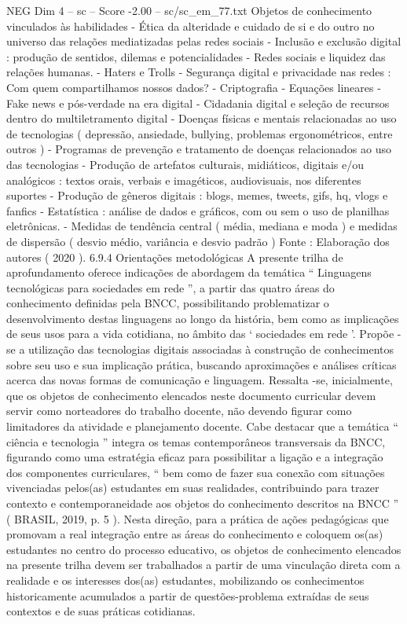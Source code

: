\begin{textsample}{NEG Dim 4 – sc – Score -2.00 – sc/sc\_em\_77.txt}
Objetos de conhecimento vinculados às habilidades - Ética da alteridade e cuidado de si e do outro no universo das relações mediatizadas pelas redes sociais - Inclusão e exclusão digital : produção de sentidos, dilemas e potencialidades - Redes sociais e liquidez das relações humanas. - Haters e Trolls - Segurança digital e privacidade nas redes : Com quem compartilhamos nossos dados? - Criptografia - Equações lineares - Fake news e pós-verdade na era digital - Cidadania digital e seleção de recursos dentro do multiletramento digital - Doenças físicas e mentais relacionadas ao uso de tecnologias ( depressão, ansiedade, bullying, problemas ergonométricos, entre outros ) - Programas de prevenção e tratamento de doenças relacionados ao uso das tecnologias - Produção de artefatos culturais, midiáticos, digitais e/ou analógicos : textos orais, verbais e imagéticos, audiovisuais, nos diferentes suportes - Produção de gêneros digitais : blogs, memes, tweets, gifs, hq, vlogs e fanfics - Estatística : análise de dados e gráficos, com ou sem o uso de planilhas eletrônicas. - Medidas de tendência central ( média, mediana e moda ) e medidas de dispersão ( desvio médio, variância e desvio padrão ) Fonte : Elaboração dos autores ( 2020 ). 6.9.4 Orientações metodológicas A presente trilha de aprofundamento oferece indicações de abordagem da temática “ Linguagens tecnológicas para sociedades em rede ”, a partir das quatro áreas do conhecimento definidas pela BNCC, possibilitando problematizar o desenvolvimento destas linguagens ao longo da história, bem como as implicações de seus usos para a vida cotidiana, no âmbito das ‘ sociedades em rede ’.
Propõe -se a utilização das tecnologias digitais associadas à construção de conhecimentos sobre seu uso e sua implicação prática, buscando aproximações e análises críticas acerca das novas formas de comunicação e linguagem.
Ressalta -se, inicialmente, que os objetos de conhecimento elencados neste documento curricular devem servir como norteadores do trabalho docente, não devendo figurar como limitadores da atividade e planejamento docente.
Cabe destacar que a temática “ ciência e tecnologia ” integra os temas contemporâneos transversais da BNCC, figurando como uma estratégia eficaz para possibilitar a ligação e a integração dos componentes curriculares, “ bem como de fazer sua conexão com situações vivenciadas pelos(as) estudantes em suas realidades, contribuindo para trazer contexto e contemporaneidade aos objetos do conhecimento descritos na BNCC ” ( BRASIL, 2019, p. 5 ).
Nesta direção, para a prática de ações pedagógicas que promovam a real integração entre as áreas do conhecimento e coloquem os(as) estudantes no centro do processo educativo, os objetos de conhecimento elencados na presente trilha devem ser trabalhados a partir de uma vinculação direta com a realidade e os interesses dos(as) estudantes, mobilizando os conhecimentos historicamente acumulados a partir de questões-problema extraídas de seus contextos e de suas práticas cotidianas.

\end{textsample}
